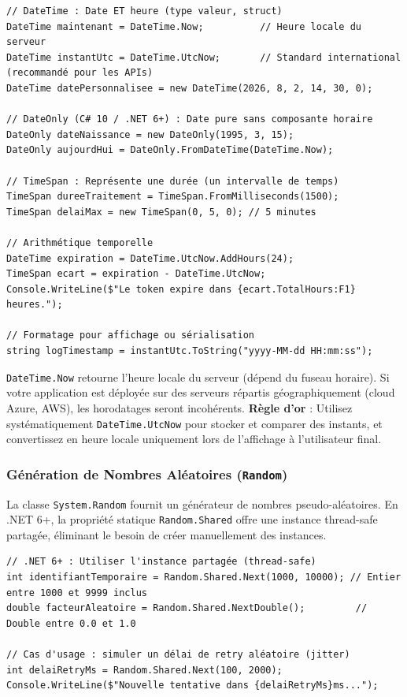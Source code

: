 \begin{lstlisting}[caption={Manipulation des types temporels}]
// DateTime : Date ET heure (type valeur, struct)
DateTime maintenant = DateTime.Now;          // Heure locale du serveur
DateTime instantUtc = DateTime.UtcNow;       // Standard international (recommandé pour les APIs)
DateTime datePersonnalisee = new DateTime(2026, 8, 2, 14, 30, 0);

// DateOnly (C# 10 / .NET 6+) : Date pure sans composante horaire
DateOnly dateNaissance = new DateOnly(1995, 3, 15);
DateOnly aujourdHui = DateOnly.FromDateTime(DateTime.Now);

// TimeSpan : Représente une durée (un intervalle de temps)
TimeSpan dureeTraitement = TimeSpan.FromMilliseconds(1500);
TimeSpan delaiMax = new TimeSpan(0, 5, 0); // 5 minutes

// Arithmétique temporelle
DateTime expiration = DateTime.UtcNow.AddHours(24);
TimeSpan ecart = expiration - DateTime.UtcNow;
Console.WriteLine($"Le token expire dans {ecart.TotalHours:F1} heures.");

// Formatage pour affichage ou sérialisation
string logTimestamp = instantUtc.ToString("yyyy-MM-dd HH:mm:ss");
\end{lstlisting}

\begin{tcolorbox}[colback=backcolour,colframe=stringcolor,title=\textbf{Piège : \texttt{DateTime.Now} vs \texttt{DateTime.UtcNow}}]
    \texttt{DateTime.Now} retourne l'heure locale du serveur (dépend du fuseau horaire). Si votre application est déployée sur des serveurs répartis géographiquement (cloud Azure, AWS), les horodatages seront incohérents. \textbf{Règle d'or} : Utilisez systématiquement \texttt{DateTime.UtcNow} pour stocker et comparer des instants, et convertissez en heure locale uniquement lors de l'affichage à l'utilisateur final.
\end{tcolorbox}

\subsubsection{Génération de Nombres Aléatoires (\texttt{Random})}

La classe \texttt{System.Random} fournit un générateur de nombres pseudo-aléatoires. En .NET 6+, la propriété statique \texttt{Random.Shared} offre une instance thread-safe partagée, éliminant le besoin de créer manuellement des instances.

\begin{lstlisting}[caption={Génération de nombres aléatoires}]
// .NET 6+ : Utiliser l'instance partagée (thread-safe)
int identifiantTemporaire = Random.Shared.Next(1000, 10000); // Entier entre 1000 et 9999 inclus
double facteurAleatoire = Random.Shared.NextDouble();         // Double entre 0.0 et 1.0

// Cas d'usage : simuler un délai de retry aléatoire (jitter)
int delaiRetryMs = Random.Shared.Next(100, 2000);
Console.WriteLine($"Nouvelle tentative dans {delaiRetryMs}ms...");
\end{lstlisting}

